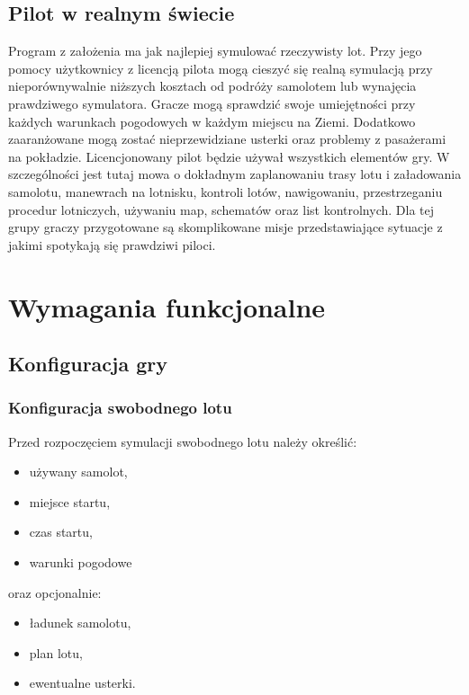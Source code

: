 \documentclass{mwrep}
\begin{document}
\section{Pilot w realnym świecie}

Program z założenia ma jak najlepiej symulować rzeczywisty lot. Przy jego pomocy użytkownicy z licencją pilota mogą cieszyć się realną symulacją przy nieporównywalnie niższych kosztach od podróży samolotem lub wynajęcia prawdziwego symulatora. Gracze mogą sprawdzić swoje umiejętności przy każdych warunkach pogodowych w każdym miejscu na Ziemi. Dodatkowo zaaranżowane mogą zostać nieprzewidziane usterki oraz problemy z pasażerami na pokładzie. Licencjonowany pilot będzie używał wszystkich elementów gry. W szczególności jest tutaj mowa o dokładnym zaplanowaniu trasy lotu i załadowania samolotu, manewrach na lotnisku, kontroli lotów, nawigowaniu, przestrzeganiu procedur lotniczych, używaniu map, schematów oraz list kontrolnych. Dla tej grupy graczy przygotowane są skomplikowane misje przedstawiające sytuacje z jakimi spotykają się prawdziwi piloci.

\chapter{Wymagania funkcjonalne}

\section{Konfiguracja gry}

\subsection{Konfiguracja swobodnego lotu}

Przed rozpoczęciem symulacji swobodnego lotu należy określić:
\begin{itemize}
\item używany samolot,
\item miejsce startu,
\item czas startu,
\item warunki pogodowe
\end{itemize}
oraz opcjonalnie:
\begin{itemize}
\item ładunek samolotu,
\item plan lotu,
\item ewentualne usterki.
\end{itemize}
\end{document}
